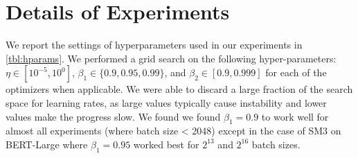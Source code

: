 \documentclass[a4paper,11pt]{article}
\def\NAME{SM3\xspace}
\begin{document}
\section{Details of Experiments}
\label{sec:exper-detail}

We report the settings of hyperparameters used in our experiments in
\cref{tbl:hparams}. We performed a grid search on the following
hyper-parameters: $\eta \in [10^{-5},10^{0}]$,  $\beta_1 \in \{0.9, 0.95,
0.99\}$, and $\beta_2 \in [0.9, 0.999]$ for each of the optimizers when
applicable. We were able to discard a large fraction of the search space for
learning rates, as large values typically cause instability and lower values
make the progress slow. We found we found $\beta_1 = 0.9$ to work well for
almost all experiments (where batch size < 2048) except in the case of \NAME
on BERT-Large where $\beta_1 = 0.95$ worked best for $2^{13}$ and $2^{16}$
batch sizes.
\end{document}

